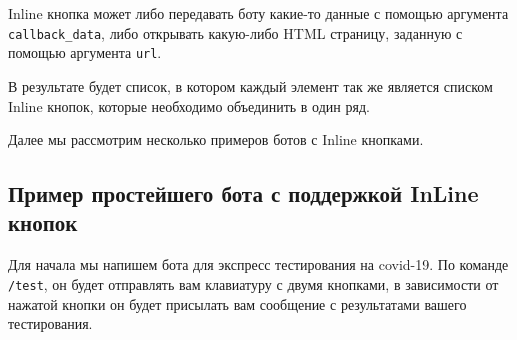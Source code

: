\documentclass[
]{book}
\begin{document}
Inline кнопка может либо передавать боту какие-то данные с помощью аргумента \texttt{callback\_data}, либо открывать какую-либо HTML страницу, заданную с помощью аргумента \texttt{url}.

В результате будет список, в котором каждый элемент так же является списком Inline кнопок, которые необходимо объединить в один ряд.

Далее мы рассмотрим несколько примеров ботов с Inline кнопками.

\subsection{Пример простейшего бота с поддержкой InLine кнопок}\label{ux43fux440ux438ux43cux435ux440-ux43fux440ux43eux441ux442ux435ux439ux448ux435ux433ux43e-ux431ux43eux442ux430-ux441-ux43fux43eux434ux434ux435ux440ux436ux43aux43eux439-inline-ux43aux43dux43eux43fux43eux43a}

Для начала мы напишем бота для экспресс тестирования на covid-19. По команде \texttt{/test}, он будет отправлять вам клавиатуру с двумя кнопками, в зависимости от нажатой кнопки он будет присылать вам сообщение с результатами вашего тестирования.
\end{document}
